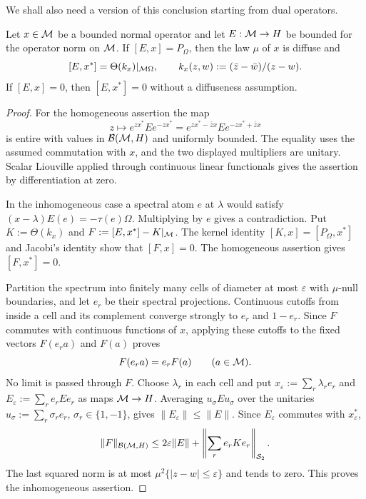 We shall also need a version of this conclusion starting from dual operators.
\begin{lemma}\label{lem:commutation}
Let $x\in\mathcal M$ be a bounded normal operator and let $E:\mathcal M\to H$ be bounded for the operator norm on $\mathcal M$.
If $[E,x]=P_\Omega$, then the law $\mu$ of $x$ is diffuse and
\[
 [E,x^*]=\Theta(k_x)|_{\mathcal M\Omega},\qquad
 k_x(z,w):=(\bar z-\bar w)/(z-w).
\]
If $[E,x]=0$, then $[E,x^*]=0$ without a diffuseness assumption.
\end{lemma}
\begin{proof}
For the homogeneous assertion the map
\[
 z\longmapsto e^{zx^*}Ee^{-zx^*}
 =e^{zx^*-\bar z x}Ee^{-zx^*+\bar z x}
\]
is entire with values in $\mathcal B(\mathcal M,H)$ and uniformly bounded.
The equality uses the assumed commutation with $x$, and the two displayed multipliers are unitary.
Scalar Liouville applied through continuous linear functionals gives the assertion by differentiation at zero.

In the inhomogeneous case a spectral atom $e$ at $\lambda$ would satisfy
$(x-\lambda)E(e)=-\tau(e)\Omega$.
Multiplying by $e$ gives a contradiction.
Put $K:=\Theta(k_x)$ and $F:=[E,x^*]-K|_\mathcal M$.
The kernel identity $[K,x]=[P_\Omega,x^*]$ and Jacobi's identity show that $[F,x]=0$.
The homogeneous assertion gives $[F,x^*]=0$.

Partition the spectrum into finitely many cells of diameter at most $\varepsilon$ with $\mu$-null boundaries, and let $e_r$ be their spectral projections.
Continuous cutoffs from inside a cell and its complement converge strongly to $e_r$ and $1-e_r$.
Since $F$ commutes with continuous functions of $x$, applying these cutoffs to the fixed vectors $F(e_ra)$ and $F(a)$ proves
\[
 F(e_ra)=e_rF(a)\qquad(a\in\mathcal M).
\]
No limit is passed through $F$.
Choose $\lambda_r$ in each cell and put $x_\varepsilon:=\sum_r\lambda_re_r$ and $E_\varepsilon:=\sum_re_rEe_r$ as maps $\mathcal M\to H$.
Averaging $u_\sigma E u_\sigma$ over the unitaries $u_\sigma:=\sum_r\sigma_re_r$, $\sigma_r\in\{1,-1\}$, gives $\|E_\varepsilon\|\le\|E\|$.
Since $E_\varepsilon$ commutes with $x_\varepsilon^*$,
\[
 \|F\|_{\mathcal B(\mathcal M,H)}
 \le2\varepsilon\|E\|+
 \left\|\sum_re_rKe_r\right\|_{\mathcal S_2}.
\]
The last squared norm is at most $\mu^2\{|z-w|\le\varepsilon\}$ and tends to zero.
This proves the inhomogeneous assertion.
\end{proof}

